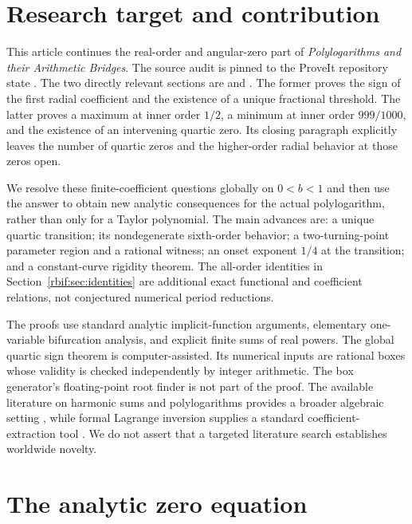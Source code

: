 \section{Research target and contribution}
\label{rbif:sec:overview}
This article continues the real-order and angular-zero part of
\emph{Polylogarithms and their Arithmetic Bridges}. The source audit is
pinned to the ProveIt repository state
.
The two directly relevant sections are
 and 
\cite{rbif:local,rbif:turning}. The former proves the sign of the first
radial coefficient and the existence of a unique fractional threshold.
The latter proves a maximum at inner order $1/2$, a minimum at inner order
$999/1000$, and the existence of an intervening quartic zero. Its closing
paragraph explicitly leaves the number of quartic zeros and the
higher-order radial behavior at those zeros open.

We resolve these finite-coefficient questions globally on $0<b<1$ and
then use the answer to obtain new analytic consequences for the actual
polylogarithm, rather than only for a Taylor polynomial. The main advances
are: a unique quartic transition; its nondegenerate sixth-order behavior;
a two-turning-point parameter region and a rational witness; an onset
exponent $1/4$ at the transition; and a constant-curve rigidity theorem.
The all-order identities in Section~\ref{rbif:sec:identities} are additional
exact functional and coefficient relations, not conjectured numerical
period reductions.

The proofs use standard analytic implicit-function arguments, elementary
one-variable bifurcation analysis, and explicit finite sums of real powers.
The global quartic sign theorem is computer-assisted. Its numerical inputs
are rational boxes whose validity is checked independently by integer
arithmetic. The box generator's floating-point root finder is not part of
the proof. The available literature on harmonic sums and polylogarithms
provides a broader algebraic setting \cite{rbif:abl}, while formal Lagrange
inversion supplies a standard coefficient-extraction tool
\cite{rbif:gessel}. We do not assert that a targeted literature search
establishes worldwide novelty.

\section{The analytic zero equation}
\label{rbif:sec:equation}
